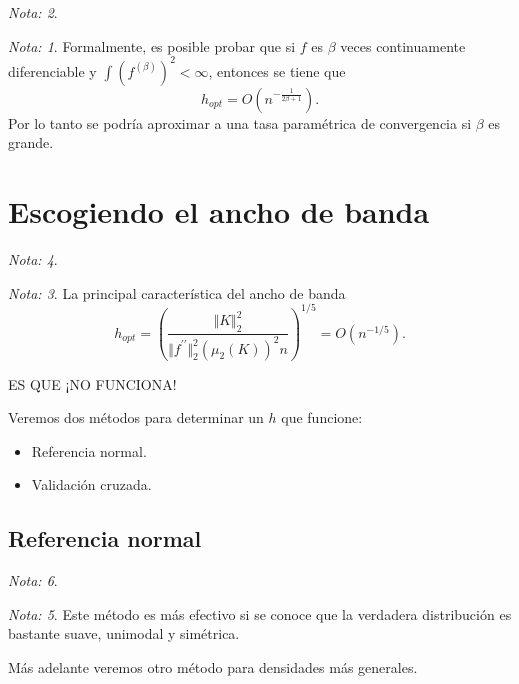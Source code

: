 \documentclass[
  12pt,
]{book}
\providecommand{\tightlist}{%
  \setlength{\itemsep}{0pt}\setlength{\parskip}{0pt}}
\theoremstyle{definition}
\theoremstyle{definition}
\theoremstyle{definition}
\theoremstyle{remark}
\newtheorem*{remark}{Nota: }
\begin{document}
\begin{remark}
\begin{remark}

{}Formalmente, es posible probar que si \(f\) es \(\beta\) veces continuamente diferenciable y \(\int\left(f^{(\beta)}\right)^{2}<\infty\), entonces se tiene que
\[
{\displaystyle h_{opt}=O\left(n^{-\frac{1}{2\beta+1}}\right).}
\]
Por lo tanto se podría aproximar a una tasa paramétrica de convergencia si
\(\beta\) es grande.

\end{remark}
\end{remark}

\hypertarget{escogiendo-el-ancho-de-banda}{%
\section{Escogiendo el ancho de banda}\label{escogiendo-el-ancho-de-banda}}

\begin{remark}
\begin{remark}

{}La principal característica del ancho de banda
\begin{equation*}
h_{opt}=\left(\frac{\Vert K\Vert_{2}^{2}}{\Vert f^{\prime\prime}\Vert_{2}^{2}\left(\mu_{2}(K)\right)^{2}n}\right)^{1/5}=O\left( n^{-1/5} \right).
\end{equation*}

ES QUE ¡NO FUNCIONA!

\end{remark}
\end{remark}

Veremos dos métodos para determinar un \(h\) que funcione:

\begin{itemize}
\tightlist
\item
  Referencia normal.
\item
  Validación cruzada.
\end{itemize}

\hypertarget{referencia-normal}{%
\subsection{Referencia normal}\label{referencia-normal}}

\begin{remark}
\begin{remark}

{}Este método es más efectivo si se conoce que la verdadera distribución es bastante suave, unimodal y simétrica.

Más adelante veremos otro método para densidades más generales.

\end{remark}
\end{remark}
\end{document}
